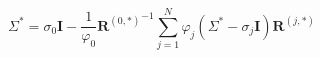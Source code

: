 \begin{displaymath}
\Sigma^\ast = \sigma_0\mathbf{I} - \frac{1}{\varphi_0}{\mathbf{R}^{(0,\ast)}}^{-1} \sum_{j=1}^N \varphi_j(\Sigma^\ast-\sigma_j\mathbf{I})\mathbf{R}^{(j,*)}
\label{eq:emt_berryman_update}
\end{displaymath}


